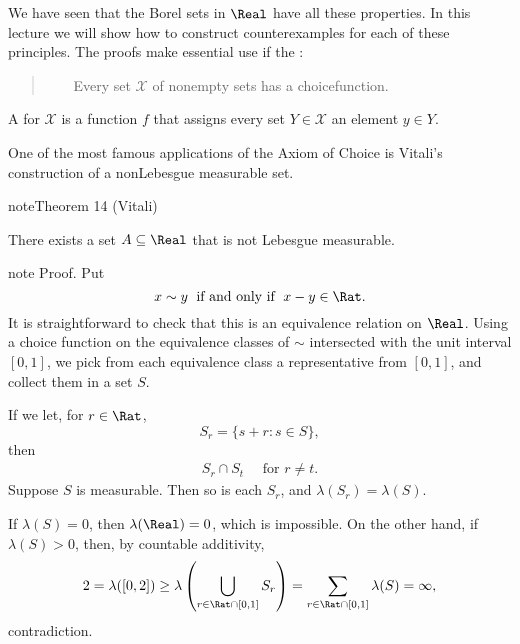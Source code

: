 \documentclass[letterpaper,10pt,english]{jupyterBook}
\begin{document}
\sphinxAtStartPar
We have seen that the Borel sets in \(\Real\) have all these properties. In this lecture we will show how to construct counterexamples for each of these principles. The proofs make essential use if the :
\begin{quote}

\sphinxAtStartPar
{}     Every set \(\mathcal{X}\) of non\sphinxhyphen{}empty sets has a choice\sphinxhyphen{}function.
\end{quote}

\sphinxAtStartPar
A  for \(\mathcal{X}\) is a function \(f\) that assigns every set \(Y \in \mathcal{X}\) an element \(y \in Y\).

\sphinxAtStartPar
One of the most famous applications of the Axiom of Choice is Vitali’s construction of a non\sphinxhyphen{}Lebesgue measurable set.
\label{choice:thm-Vitali-nonmeasurable}
\begin{sphinxadmonition}{note}{Theorem 14 (Vitali)}



\sphinxAtStartPar
There exists a set \(A \subseteq \Real\) that is not Lebesgue measurable.
\end{sphinxadmonition}

\begin{sphinxadmonition}{note}
\sphinxAtStartPar
Proof. Put
\begin{equation*}
    x \sim y \; \text{ if and only if }\;  x-y \in \Rat.
\end{equation*}
\sphinxAtStartPar
It is straightforward to check that this is an equivalence relation on \(\Real\).
Using a choice function on the equivalence classes of \(\sim\) intersected with the unit interval \([0,1]\), we pick from each equivalence class a representative from \([0,1]\), and collect them in a set \(S\).

\sphinxAtStartPar
If we let, for \(r \in \Rat\),
\begin{equation*}
    S_r = \{s+r \colon s \in S \},
\end{equation*}
\sphinxAtStartPar
then
\begin{equation*}
\begin{split}S_r \cap S_t \quad \text{ for $r \neq t$}.\end{split}
\end{equation*}
\sphinxAtStartPar
Suppose \(S\) is measurable. Then so is each \(S_r\), and \(\lambda(S_r) = \lambda(S)\).

\sphinxAtStartPar
If \(\lambda(S) = 0\), then \(\lambda(\Real) = 0\), which is impossible.
On the other hand, if \(\lambda(S) > 0\), then, by countable additivity,
\begin{equation*}
    2 = \lambda([0,2]) \geq \lambda\left(\bigcup_{r\in \Rat\cap[0,1]} S_r\right) = \sum_{r\in \Rat\cap[0,1]} \lambda(S) = \infty,
\end{equation*}
\sphinxAtStartPar
contradiction.
\end{sphinxadmonition}
\end{document}
